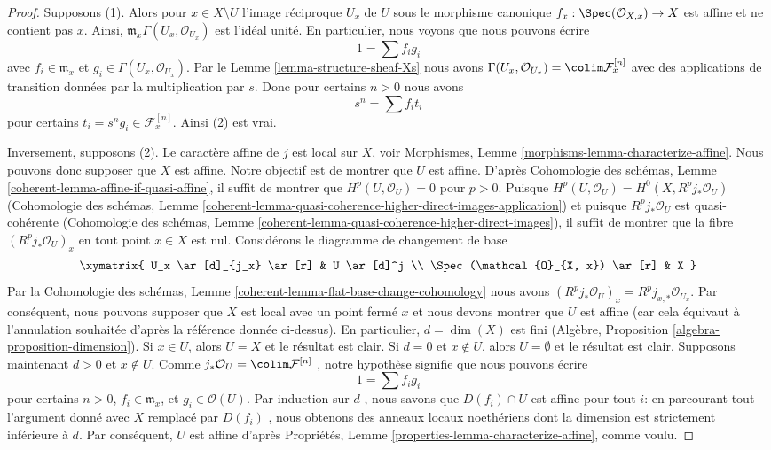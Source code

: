 \begin{proof}
Supposons (1). Alors pour  $x \in X \setminus U$  l'image réciproque  $U_x$  de
 $U$  sous le morphisme canonique  $f_x : \Spec(\mathcal{O}_{X, x}) \to X$  est affine et ne contient
pas  $x$. Ainsi,  $\mathfrak m_x \Gamma(U_x, \mathcal{O}_{U_x})$  est l'idéal unité. En particulier, nous
voyons que nous pouvons écrire
$$
1 = \sum f_i g_i
$$
avec  $f_i \in \mathfrak m_x$  et  $g_i \in \Gamma(U_x, \mathcal{O}_{U_x})$. Par le Lemme  \ref{lemma-structure-sheaf-Xs}  nous avons
 $\Gamma(U_x, \mathcal{O}_{U_x}) = \colim \mathcal{F}^{[n]}_x$  avec des applications de transition données par la multiplication par
 $s$. Donc pour certains  $n > 0$  nous avons
$$
s^n = \sum f_i t_i
$$
pour certains  $t_i = s^ng_i \in \mathcal{F}^{[n]}_x$. Ainsi (2) est vrai.

\medskip\noindent
Inversement, supposons (2). Le caractère affine de  $j$  est
local sur  $X$, voir Morphismes, Lemme  \ref{morphisms-lemma-characterize-affine}. Nous pouvons donc
supposer que  $X$  est affine. Notre objectif est de montrer que
 $U$  est affine. D'après Cohomologie des schémas, Lemme  \ref{coherent-lemma-affine-if-quasi-affine}, il suffit
de montrer que  $H^p(U, \mathcal{O}_U) = 0$  pour  $p > 0$. Puisque  $H^p(U, \mathcal{O}_U) = H^0(X, R^pj_*\mathcal{O}_U)$  (Cohomologie
des schémas, Lemme  \ref{coherent-lemma-quasi-coherence-higher-direct-images-application}) et puisque  $R^pj_*\mathcal{O}_U$  est quasi-cohérente
(Cohomologie des schémas, Lemme  \ref{coherent-lemma-quasi-coherence-higher-direct-images}), il suffit de montrer que la fibre
 $(R^pj_*\mathcal{O}_U)_x$  en tout point  $x \in X$  est nul. Considérons le diagramme de
changement de base
$$
\xymatrix{
U_x \ar[d]_{j_x} \ar[r] & U \ar[d]^j \\
\Spec(\mathcal{O}_{X, x}) \ar[r] & X
}
$$
Par la Cohomologie des schémas, Lemme  \ref{coherent-lemma-flat-base-change-cohomology}  nous avons  $(R^pj_*\mathcal{O}_U)_x = R^pj_{x, *}\mathcal{O}_{U_x}$. Par
conséquent, nous pouvons supposer que  $X$  est local avec un point fermé
 $x$  et nous devons montrer que  $U$  est affine (car cela équivaut
à l'annulation souhaitée d'après la référence donnée ci-dessus). En particulier,
 $d = \dim(X)$  est fini (Algèbre, Proposition  \ref{algebra-proposition-dimension}). Si  $x \in U$, alors
 $U = X$  et le résultat est clair. Si  $d = 0$  et  $x \not \in U$, alors
 $U = \emptyset$  et le résultat est clair. Supposons maintenant  $d > 0$  et
 $x \not \in U$. Comme  $j_*\mathcal{O}_U = \colim \mathcal{F}^{[n]}$ , notre hypothèse signifie que nous pouvons écrire
$$
1 = \sum f_i g_i
$$
pour certains  $n > 0$,  $f_i \in \mathfrak m_x$, et  $g_i \in \mathcal{O}(U)$. Par induction sur
 $d$ , nous savons que  $D(f_i) \cap U$  est affine pour tout  $i$: en
parcourant tout l'argument donné avec  $X$  remplacé par  $D(f_i)$ , nous
obtenons des anneaux locaux noethériens dont la dimension est strictement
inférieure à  $d$. Par conséquent,  $U$  est affine d'après
Propriétés, Lemme  \ref{properties-lemma-characterize-affine}, comme voulu.
\end{proof}





